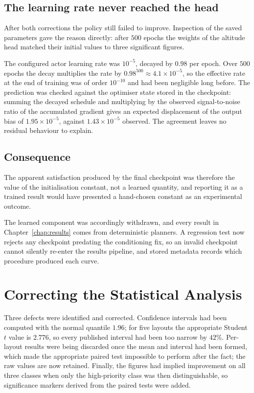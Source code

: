 \subsection{The learning rate never reached the head}

After both corrections the policy still failed to improve. Inspection of the saved parameters gave the reason directly: after $500$ epochs the weights of the altitude head matched their initial values to three significant figures.

The configured actor learning rate was $10^{-5}$, decayed by $0.98$ per epoch. Over $500$ epochs the decay multiplies the rate by $0.98^{500} \approx 4.1 \times 10^{-5}$, so the effective rate at the end of training was of order $10^{-10}$ and had been negligible long before. The prediction was checked against the optimiser state stored in the checkpoint: summing the decayed schedule and multiplying by the observed signal-to-noise ratio of the accumulated gradient gives an expected displacement of the output bias of $1.95 \times 10^{-5}$, against $1.43 \times 10^{-5}$ observed. The agreement leaves no residual behaviour to explain.

\subsection{Consequence}

The apparent satisfaction produced by the final checkpoint was therefore the value of the initialisation constant, not a learned quantity, and reporting it as a trained result would have presented a hand-chosen constant as an experimental outcome.

The learned component was accordingly withdrawn, and every result in Chapter~\ref{chap:results} comes from deterministic planners. A regression test now rejects any checkpoint predating the conditioning fix, so an invalid checkpoint cannot silently re-enter the results pipeline, and stored metadata records which procedure produced each curve.

\section{Correcting the Statistical Analysis}

Three defects were identified and corrected. Confidence intervals had been computed with the normal quantile $1.96$; for five layouts the appropriate Student $t$ value is $2.776$, so every published interval had been too narrow by $42\%$. Per-layout results were being discarded once the mean and interval had been formed, which made the appropriate paired test impossible to perform after the fact; the raw values are now retained. Finally, the figures had implied improvement on all three classes when only the high-priority class was then distinguishable, so significance markers derived from the paired tests were added.

